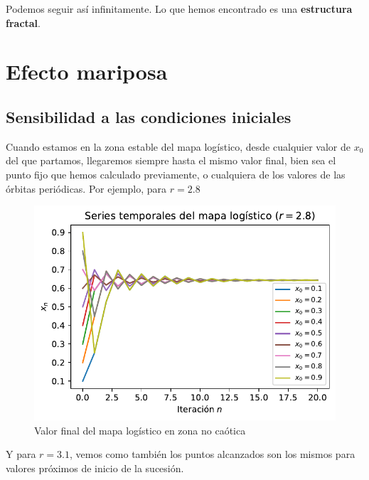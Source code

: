 \documentclass[
  10pt,
  a4paper,
  DIV=11,
  numbers=noendperiod,
  open=any]{scrreprt}
\numberwithin{equation}{chapter}
\numberwithin{equation}{section}
\renewcommand{\[}{\begin{equation}}
\renewcommand{\]}{\end{equation}}
\begin{document}
Podemos seguir así infinitamente. Lo que hemos encontrado es una
\textbf{estructura fractal}.

\chapter{Efecto mariposa}\label{efecto-mariposa}

\section{Sensibilidad a las condiciones
iniciales}\label{sec-sensibilidad}

Cuando estamos en la zona estable del mapa logístico, desde cualquier
valor de \(x_0\) del que partamos, llegaremos siempre hasta el mismo
valor final, bien sea el punto fijo que hemos calculado previamente, o
cualquiera de los valores de las órbitas periódicas. Por ejemplo, para
\(r=2.8\)

\begin{figure}[h]
  \centering
  \includegraphics[keepaspectratio]{01-logistica/lyapunov_files/figure-pdf/cell-2-output-1.pdf}
  \caption{Valor final del mapa logístico en zona no caótica}
\end{figure} 

Y para \(r=3.1\), vemos como también los puntos alcanzados son los
mismos para valores próximos de inicio de la sucesión.
\end{document}
